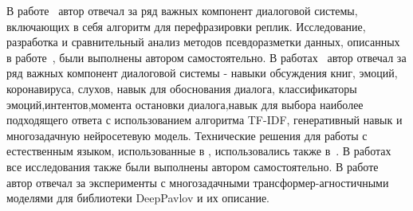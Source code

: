 {\contribution} В работе~\cite{Болотин_Карпов_Рашков_Шкурак_2019} автор отвечал за ряд важных компонент диалоговой системы, включающих в себя алгоритм для перефразировки реплик. Исследование, разработка и сравнительный анализ методов псевдоразметки данных, описанных в работе~\cite{pseudolabel}, были выполнены автором самостоятельно. В работах~\cite{dream1,dream1_trudy,dream2} автор отвечал за ряд важных компонент диалоговой системы - навыки обсуждения книг, эмоций, коронавируса, слухов, навык для обоснования диалога, классификаторы эмоций,интентов,момента остановки диалога,навык для выбора наиболее подходящего ответа с использованием алгоритма TF-IDF, генеративный навык и многозадачную нейросетевую модель. Технические решения для работы с естественным языком, использованные в \cite{dream1,dream1_trudy,dream2}, использовались также в~\cite{Дуплякин_Дмитрий_Ондар_Ушаков_2021}. В работах~\cite{rumtl,enmtl,rutopics} все исследования также были выполнены автором самостоятельно. В работе~\cite{dp_2023} автор отвечал за эксперименты с многозадачными трансформер-агностичными моделями для библиотеки DeepPavlov и их описание.

